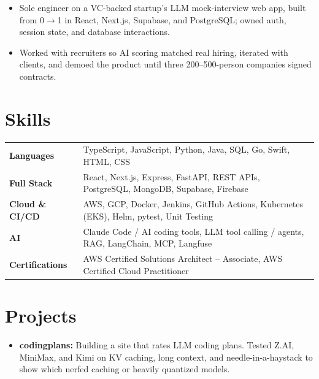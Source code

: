 \documentclass[11pt, letterpaper]{article}
\begin{document}
\vspace{1pt}
\begin{itemize}
  \item Sole engineer on a VC-backed startup's LLM mock-interview web app, built from 0$\to$1 in React, Next.js, Supabase, and PostgreSQL; owned auth, session state, and database interactions.
  \item Worked with recruiters so AI scoring matched real hiring, iterated with clients, and demoed the product until three 200--500-person companies signed contracts.
\end{itemize}

\section{Skills}
\begin{tabularx}{\textwidth}{@{}l @{\hspace{7pt}} >{\raggedright\arraybackslash}X@{}}
  \textbf{Languages} & TypeScript, JavaScript, Python, Java, SQL, Go, Swift, HTML, CSS \\[1pt]
  \textbf{Full Stack} & React, Next.js, Express, FastAPI, REST APIs, PostgreSQL, MongoDB, Supabase, Firebase \\[1pt]
  \textbf{Cloud \& CI/CD} & AWS, GCP, Docker, Jenkins, GitHub Actions, Kubernetes (EKS), Helm, pytest, Unit Testing \\[1pt]
  \textbf{AI} & Claude Code / AI coding tools, LLM tool calling / agents, RAG, LangChain, MCP, Langfuse \\[1pt]
  \textbf{Certifications} & AWS Certified Solutions Architect -- Associate, AWS Certified Cloud Practitioner \\
\end{tabularx}

\section{Projects}
\begin{itemize}
  \item \textbf{codingplans:} Building a site that rates LLM coding plans. Tested Z.AI, MiniMax, and Kimi on KV caching, long context, and needle-in-a-haystack to show which nerfed caching or heavily quantized models.
\end{itemize}
\end{document}
